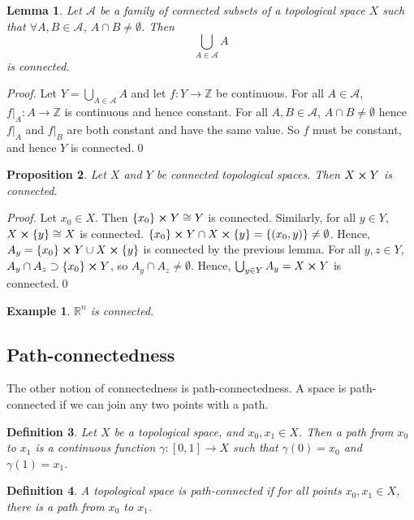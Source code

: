 \documentclass{article}
\theoremstyle{plain}\theoremheaderfont{\normalfont\itshape}\theorembodyfont{\rmfamily}\theoremseparator{.}\newtheorem*{rem}{Remark}\newtheorem*{ex}{Example}\newtheorem*{proof}{Proof}\newtheorem*{altp}{Alternative proof}
\theoremstyle{plain}\theoremheaderfont{\normalfont\bfseries}\theorembodyfont{\rmfamily}\theoremseparator{.}\newtheorem{thm}{Theorem}[section]\newtheorem{lem}[thm]{Lemma}\newtheorem{prop}[thm]{Proposition}\newtheorem*{cor}{Corollary}\newtheorem{defn}[thm]{Definition}\newtheorem{clm}[thm]{Claim}\newtheorem{clminproof}{Claim}
\theoremstyle{break}\theoremheaderfont{\normalfont\itshape}\theorembodyfont{\rmfamily}\theoremseparator{.\medskip}\newtheorem*{proofskip}{Proof}\newtheorem*{exs}{Examples}\newtheorem*{rems}{Remarks}
\theoremstyle{break}\theoremheaderfont{\normalfont\bfseries}\theorembodyfont{\rmfamily}\theoremseparator{.\medskip}\newtheorem{lemskip}[thm]{Lemma}\newtheorem{defnskip}[thm]{Definition}\newtheorem{propskip}[thm]{Proposition}\newtheorem{thmskip}[thm]{Theorem}
\newcommand{\qed}{\hfill\ensuremath{\Box}}
\begin{document}
    \begin{lem}
        Let \(\mathscr{A}\) be a family of connected subsets of a topological space \(X\) such that \(\forall A,B\in\mathscr{A}\), \(A\cap B\ne\emptyset\). Then
        \[\bigcup_{A\in\mathscr{A}}A\]
        is connected.
    \end{lem}
    \begin{proof}
        Let \(Y=\bigcup_{A\in\mathscr{A}}A\) and let \(f:Y\to \mathbb{Z}\) be continuous. For all \(A\in\mathscr{A}\), \(f|_A:A\to\mathbb{Z}\) is continuous and hence constant. For all \(A,B\in\mathscr{A}\), \(A\cap B\ne\emptyset\) hence \(f|_A\) and \(f|_B\) are both constant and have the same value. So \(f\) must be constant, and hence \(Y\) is connected.\qed
    \end{proof}

    \begin{prop}
        Let \(X\) and \(Y\) be connected topological spaces. Then \(X\cross Y\) is connected.
    \end{prop}
    \begin{proof}
        Let \(x_0\in X\). Then \(\{x_0\}\cross Y\cong Y\) is connected. Similarly, for all \(y\in Y\), \(X\cross\{y\}\cong X\) is connected. \(\{x_0\}\cross Y\cap X\cross\{y\}=\{(x_0,y)\}\ne\emptyset\). Hence, \(A_y=\{x_0\}\cross Y\cup X\cross\{y\}\) is connected by the previous lemma. For all \(y,z\in Y\), \(A_y\cap A_z\supset\{x_0\}\cross Y\), so \(A_y\cap A_z\ne\emptyset\). Hence, \(\bigcup_{y\in Y}A_y=X\cross Y\) is connected.\qed
    \end{proof}

    \begin{ex}
        \(\mathbb{R}^n\) is connected.
    \end{ex}
    \subsection{Path-connectedness}
    The other notion of connectedness is path-connectedness. A space is path-connected if we can join any two points with a path.
    \begin{defn}
        Let \(X\) be a topological space, and \(x_0,x_1\in X\). Then a \textit{path} from \(x_0\) to \(x_1\) is a continuous function \(\gamma:[0,1]\to X\) such that \(\gamma(0)=x_0\) and \(\gamma(1)=x_1\).
    \end{defn}

    \begin{defn}
        A topological space is \textit{path-connected} if for all points \(x_0,x_1\in X\), there is a path from \(x_0\) to \(x_1\).
    \end{defn}
    
\end{document}
